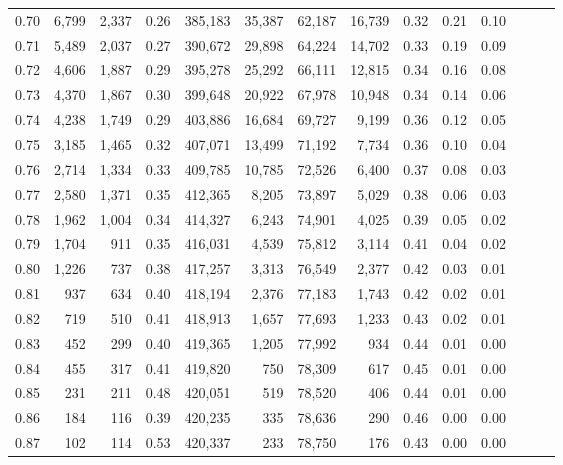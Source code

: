 \begin{tabular}{rrrrrrrrrrrrrr}
0.70 &   6,799 &  2,337 &  0.26 &  385,183 &   35,387 &  62,187 &  16,739 &  0.32 &  0.21 &      0.10 \\
0.71 &   5,489 &  2,037 &  0.27 &  390,672 &   29,898 &  64,224 &  14,702 &  0.33 &  0.19 &      0.09 \\
0.72 &   4,606 &  1,887 &  0.29 &  395,278 &   25,292 &  66,111 &  12,815 &  0.34 &  0.16 &      0.08 \\
0.73 &   4,370 &  1,867 &  0.30 &  399,648 &   20,922 &  67,978 &  10,948 &  0.34 &  0.14 &      0.06 \\
0.74 &   4,238 &  1,749 &  0.29 &  403,886 &   16,684 &  69,727 &   9,199 &  0.36 &  0.12 &      0.05 \\
0.75 &   3,185 &  1,465 &  0.32 &  407,071 &   13,499 &  71,192 &   7,734 &  0.36 &  0.10 &      0.04 \\
0.76 &   2,714 &  1,334 &  0.33 &  409,785 &   10,785 &  72,526 &   6,400 &  0.37 &  0.08 &      0.03 \\
0.77 &   2,580 &  1,371 &  0.35 &  412,365 &    8,205 &  73,897 &   5,029 &  0.38 &  0.06 &      0.03 \\
0.78 &   1,962 &  1,004 &  0.34 &  414,327 &    6,243 &  74,901 &   4,025 &  0.39 &  0.05 &      0.02 \\
0.79 &   1,704 &    911 &  0.35 &  416,031 &    4,539 &  75,812 &   3,114 &  0.41 &  0.04 &      0.02 \\
0.80 &   1,226 &    737 &  0.38 &  417,257 &    3,313 &  76,549 &   2,377 &  0.42 &  0.03 &      0.01 \\
0.81 &     937 &    634 &  0.40 &  418,194 &    2,376 &  77,183 &   1,743 &  0.42 &  0.02 &      0.01 \\
0.82 &     719 &    510 &  0.41 &  418,913 &    1,657 &  77,693 &   1,233 &  0.43 &  0.02 &      0.01 \\
0.83 &     452 &    299 &  0.40 &  419,365 &    1,205 &  77,992 &     934 &  0.44 &  0.01 &      0.00 \\
0.84 &     455 &    317 &  0.41 &  419,820 &      750 &  78,309 &     617 &  0.45 &  0.01 &      0.00 \\
0.85 &     231 &    211 &  0.48 &  420,051 &      519 &  78,520 &     406 &  0.44 &  0.01 &      0.00 \\
0.86 &     184 &    116 &  0.39 &  420,235 &      335 &  78,636 &     290 &  0.46 &  0.00 &      0.00 \\
0.87 &     102 &    114 &  0.53 &  420,337 &      233 &  78,750 &     176 &  0.43 &  0.00 &      0.00 \\

\end{tabular}
